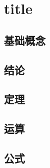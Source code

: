 \documentclass[a4paper,12pt]{article}
\begin{document}



    \section{title}

    \subsection{基础概念}

    \begin{enumerate}
    \end{enumerate}

    \subsection{结论}

    \begin{enumerate}
    \end{enumerate}


    \subsection{定理}

    \begin{enumerate}
    \end{enumerate}

    \subsection{运算}

    \begin{enumerate}

    \end{enumerate}

    \subsection{公式}

    \begin{enumerate}

    \end{enumerate}
\end{document}
